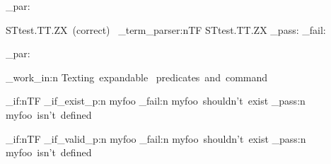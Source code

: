 \documentclass{article}
\begin{document}
\sttests_par:

STtest.TT.ZX~(correct)~
\starray_term_parser:nTF {STtest.TT.ZX}
  {\sttests_pass:}
  {\sttests_fail:}

\sttests_par:



%

\sttests_work_in:n {Texting~expandable~ predicates~and~command}


\bool_if:nTF {\starray_if_exist_p:n {myfoo}}
  {\sttests_fail:n {myfoo~shouldn't~exist}}
  { \sttests_pass:n {myfoo~isn't~defined}}

\bool_if:nTF {\starray_if_valid_p:n {myfoo}}
  {\sttests_fail:n {myfoo~shouldn't~exist}}
  { \sttests_pass:n {myfoo~isn't~defined}}
\end{document}
